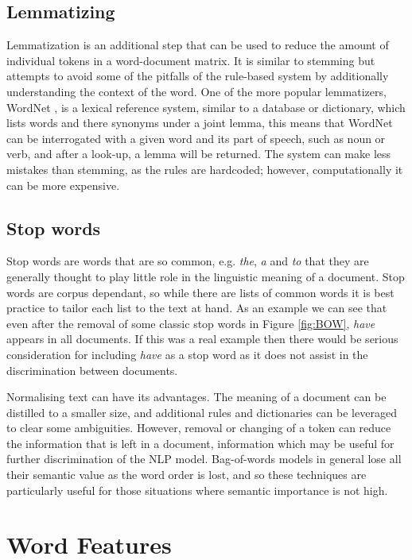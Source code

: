 \subsection{Lemmatizing} Lemmatization is an additional step that can be used to reduce the amount of individual tokens in a word-document matrix. It is similar to stemming but attempts to avoid some of the pitfalls of the rule-based system by additionally understanding the context of the word. One of the more popular lemmatizers, WordNet \parencite{MillerGeorgeA1990ItWA}, is a lexical reference system, similar to a database or dictionary, which lists words and there synonyms under a joint lemma, this means that WordNet can be interrogated with a given word and its part of speech, such as noun or verb, and after a look-up, a lemma will be returned. The system can make less mistakes than stemming, as the rules are hardcoded; however, computationally it can be more expensive.

\subsection{Stop words} Stop words are words that are so common, e.g. \emph{the}, \emph{a} and \emph{to} that they are generally thought to play little role in the linguistic meaning of a document. Stop words are corpus dependant, so while there are lists of common words it is best practice to tailor each list to the text at hand. As an example we can see that even after the removal of some classic stop words in Figure \ref{fig:BOW}, \emph{have} appears in all documents. If this was a real example then there would be serious consideration for including \emph{have} as a stop word as it does not assist in the discrimination between documents. 

Normalising text can have its advantages. The meaning of a document can be distilled to a smaller size, and additional rules and dictionaries can be leveraged to clear some ambiguities. However, removal or changing of a token can reduce the information that is left in a document, information which may be useful for further discrimination of the NLP model. Bag-of-words models in general lose all their semantic value as the word order is lost, and so these techniques are particularly useful for those situations where semantic importance is not high.

\section{Word Features}

